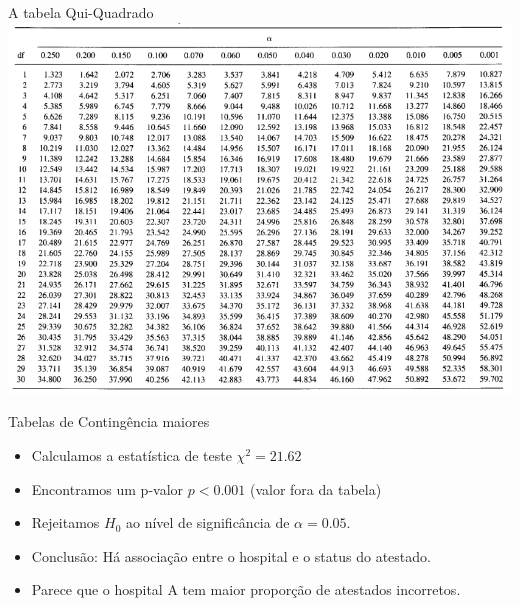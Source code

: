 \documentclass{beamer}
\begin{document}
\begin{frame}{A tabela Qui-Quadrado}
  \includegraphics[height=\textheight]{Cap26-27/qui-quadrado2}
\end{frame}

\begin{frame}{Tabelas de Contingência maiores}
  \begin{itemize}
  \item Calculamos a estatística de teste $\chi^2 = 21.62$
  \item Encontramos um p-valor $p<0.001$ (valor fora da tabela)
  \item Rejeitamos $H_0$ ao nível de significância de $\alpha = 0.05$.
  \item Conclusão: Há associação entre o hospital e o status do atestado.
  \item Parece que o hospital A tem maior proporção de atestados incorretos.
  \end{itemize}
\end{frame}



\end{document}
